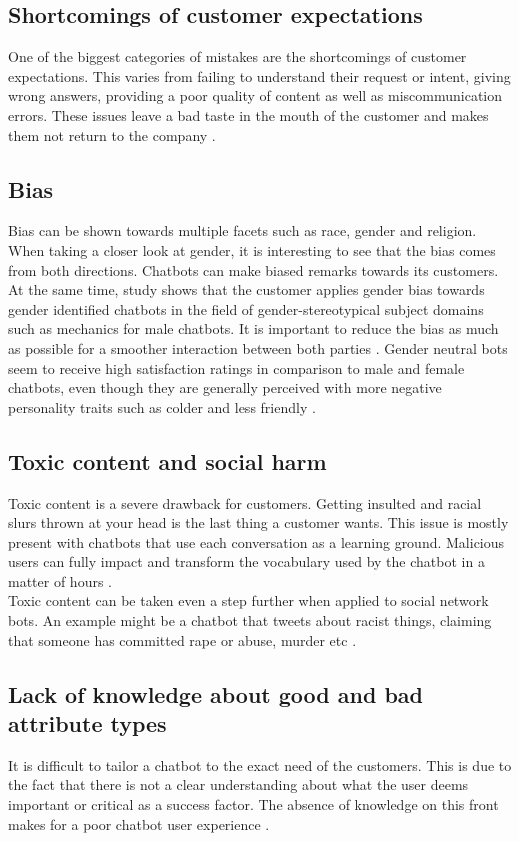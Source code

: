 \subsection{Shortcomings of customer expectations}
One of the biggest categories of mistakes are the shortcomings of customer expectations. This varies from failing to understand their request or intent, giving wrong answers, providing a poor quality of content as well as miscommunication errors. These issues leave a bad taste in the mouth of the customer and makes them not return to the company \citep*{Adamopoulou2020, Duka2021, Nichifor2021, Sheehan2020, Margot}.

\subsection{Bias}
Bias can be shown towards multiple facets such as race, gender and religion. When taking a closer look at gender, it is interesting to see that the bias comes from both directions. Chatbots can make biased remarks towards its customers. At the same time, study shows that the customer applies gender bias towards gender identified chatbots in the field of gender-stereotypical subject domains such as mechanics for male chatbots. It is important to reduce the bias as much as possible for a smoother interaction between both parties \citep*{Adamopoulou2020, McDonnell2019}. Gender neutral bots seem to receive high satisfaction ratings in comparison to male and female chatbots, even though they are generally perceived with more negative personality traits such as colder and less friendly \citep{McDonnell2019}.

\subsection{Toxic content and social harm}
Toxic content is a severe drawback for customers. Getting insulted and racial slurs thrown at your head is the last thing a customer wants. This issue is mostly present with chatbots that use each conversation as a learning ground. Malicious users can fully impact and transform the vocabulary used by the chatbot in a matter of hours \citep{Adamopoulou2020}.\\
Toxic content can be taken even a step further when applied to social network bots. An example might be a chatbot that tweets about racist things, claiming that someone has committed rape or abuse, murder etc \citep{Radziwil2021}.

\subsection{Lack of knowledge about good and bad attribute types}
It is difficult to tailor a chatbot to the exact need of the customers. This is due to the fact that there is not a clear understanding about what the user deems important or critical as a success factor. The absence of knowledge on this front makes for a poor chatbot user experience \citep{brandtzaeg2020}.

